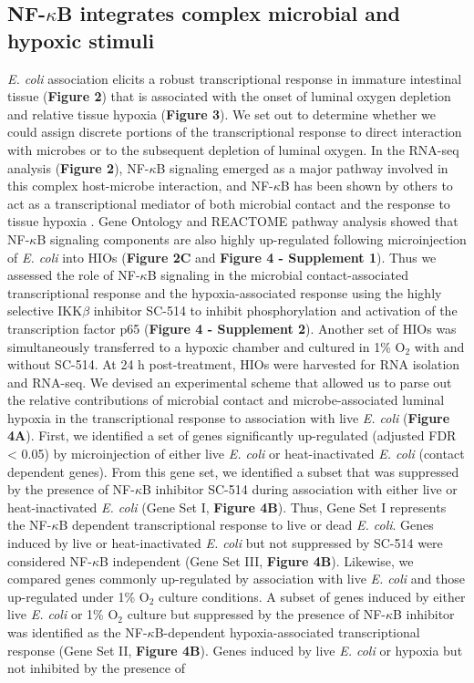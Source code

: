 \documentclass[9pt,lineo]{elife}
\begin{document}
\subsection*{{\bfseries\sffamily } NF-\(\kappa\)B integrates complex microbial and hypoxic stimuli}
\label{sec:orgheadline6}
\emph{E. coli} association elicits a robust transcriptional response in immature intestinal tissue (\textbf{Figure 2}) that is associated with the onset of luminal oxygen depletion and relative tissue hypoxia (\textbf{Figure 3}). We set out to determine whether we could assign discrete portions of the transcriptional response to direct interaction with microbes or to the subsequent depletion of luminal oxygen. In the RNA-seq analysis (\textbf{Figure 2}), NF-\(\kappa\)B signaling emerged as a major pathway involved in this complex host-microbe interaction, and NF-\(\kappa\)B has been shown by others to act as a transcriptional mediator of both microbial contact and the response to tissue hypoxia  \citep{Rius:2008,Gilmore:2006,Wullaert:2011}. Gene Ontology and REACTOME pathway analysis showed that NF-\(\kappa\)B signaling components are also highly up-regulated following microinjection of \emph{E. coli} into HIOs (\textbf{Figure 2C} and \textbf{Figure 4 - Supplement 1}).  Thus we assessed the role of NF-\(\kappa\)B signaling in the microbial contact-associated transcriptional response and the hypoxia-associated response using the highly selective IKK\(\beta\) inhibitor SC-514 \citep{Kishore:2003,Litvak:2009} to inhibit phosphorylation and activation of the transcription factor p65 (\textbf{Figure 4 - Supplement 2}). Another set of HIOs was simultaneously transferred to a hypoxic chamber and cultured in 1\% O\(_{\text{2}}\) with and without SC-514. At 24 h post-treatment, HIOs were harvested for RNA isolation and RNA-seq. We devised an experimental scheme that allowed us to parse out the relative contributions of microbial contact and microbe-associated luminal hypoxia in the transcriptional response to association with live \emph{E. coli} (\textbf{Figure 4A}). First, we identified a set of genes significantly up-regulated (adjusted FDR < 0.05) by microinjection of either live \emph{E. coli} or heat-inactivated \emph{E. coli} (contact dependent genes). From this gene set, we identified a subset that was suppressed by the presence of NF-\(\kappa\)B inhibitor SC-514 during association with either live or heat-inactivated \emph{E. coli} (Gene Set I, \textbf{Figure 4B}). Thus, Gene Set I represents the NF-\(\kappa\)B dependent transcriptional response to live or dead \emph{E. coli}. Genes induced by live or heat-inactivated \emph{E. coli} but not suppressed by SC-514 were considered NF-\(\kappa\)B independent (Gene Set III, \textbf{Figure 4B}). Likewise, we compared genes commonly up-regulated by association with live \emph{E. coli} and those up-regulated under 1\% O\(_{\text{2}}\) culture conditions. A subset of genes induced by either live \emph{E. coli} or 1\% O\(_{\text{2}}\) culture but suppressed by the presence of NF-\(\kappa\)B inhibitor was identified as the NF-\(\kappa\)B-dependent hypoxia-associated transcriptional response (Gene Set II, \textbf{Figure 4B}). Genes induced by live \emph{E. coli} or hypoxia but not inhibited by the presence of 
\end{document}
